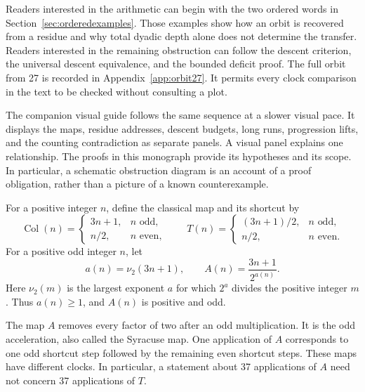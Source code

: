 Readers interested in the arithmetic can begin with the two ordered words in Section~\ref{sec:orderedexamples}. Those examples show how an orbit is recovered from a residue and why total dyadic depth alone does not determine the transfer. Readers interested in the remaining obstruction can follow the descent criterion, the universal descent equivalence, and the bounded deficit proof. The full orbit from 27 is recorded in Appendix~\ref{app:orbit27}. It permits every clock comparison in the text to be checked without consulting a plot.

The companion visual guide follows the same sequence at a slower visual pace. It displays the maps, residue addresses, descent budgets, long runs, progression lifts, and the counting contradiction as separate panels. A visual panel explains one relationship. The proofs in this monograph provide its hypotheses and its scope. In particular, a schematic obstruction diagram is an account of a proof obligation, rather than a picture of a known counterexample.

\begin{definition}\label{def:maps}
For a positive integer $n$, define the classical map and its shortcut by
\begin{equation}\label{eq:classical}
\operatorname{Col}(n)=
\begin{cases}3n+1,&n\text{ odd},\\n/2,&n\text{ even},\end{cases}
\qquad
T(n)=
\begin{cases}(3n+1)/2,&n\text{ odd},\\n/2,&n\text{ even}.\end{cases}
\end{equation}
For a positive odd integer $n$, let
\begin{equation}\label{eq:oddmap}
a(n)=\nu_2(3n+1),\qquad A(n)=\frac{3n+1}{2^{a(n)}}.
\end{equation}
Here $\nu_2(m)$ is the largest exponent $a$ for which $2^a$ divides the positive integer $m$. Thus $a(n)\ge1$, and $A(n)$ is positive and odd.
\end{definition}

The map $A$ removes every factor of two after an odd multiplication. It is the odd acceleration, also called the Syracuse map. One application of $A$ corresponds to one odd shortcut step followed by the remaining even shortcut steps. These maps have different clocks. In particular, a statement about 37 applications of $A$ need not concern 37 applications of $T$.

